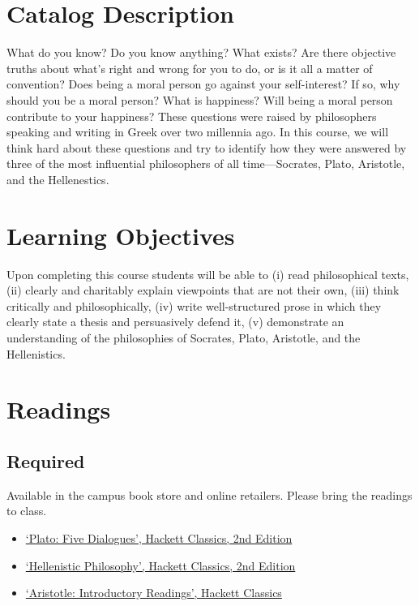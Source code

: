\documentclass[article,oneside]{memoir}
\begin{document}
\section{Catalog Description}

What do you know? Do you know anything? What exists? Are there objective truths about what’s right and wrong for you to do, or is it all a matter of convention? Does being a moral person go against your self-interest? If so, why should you be a moral person? What is happiness? Will being a moral person contribute to your happiness? These questions were raised by philosophers speaking and writing in Greek over two millennia ago. In this course, we will think hard about these questions and try to identify how they were answered by three of the most influential philosophers of all time---Socrates, Plato, Aristotle, and the Hellenestics. 

\section{Learning Objectives}

Upon completing this course students will be able to (i) read
philosophical texts, (ii) clearly and charitably explain viewpoints that
are not their own, (iii) think critically and philosophically, (iv)
write well-structured prose in which they clearly state a thesis and
persuasively defend it, (v) demonstrate an understanding of the
philosophies of Socrates, Plato, Aristotle, and the Hellenistics.


\section{Readings}
\subsection{Required}
Available in the campus book store and online retailers. Please bring the readings to class.
\begin{itemize}
\item \href{http://www.amazon.com/Plato-Dialogues-Euthyphro-Apology-Classics/dp/0872206335/ref=sr_1_1?ie=UTF8&qid=1452099006&sr=8-1&keywords=plato+five+dialogues}{`Plato: Five Dialogues', Hackett Classics, 2nd Edition}
\item \href{http://www.amazon.com/Hellenistic-Philosophy-Hackett-Classics-Inwood/dp/0872203786/ref=sr_1_1?ie=UTF8&qid=1452099186&sr=8-1&keywords=hellenistic+philosophy}{`Hellenistic Philosophy', Hackett Classics, 2nd Edition}
\item \href{http://www.amazon.com/Aristotle-Introductory-Readings-Hackett-Classics/dp/0872203395/ref=sr_1_1?ie=UTF8&qid=1452102830&sr=8-1&keywords=aristotle+hackett}{`Aristotle: Introductory Readings', Hackett Classics}
\end{itemize}
\end{document}
